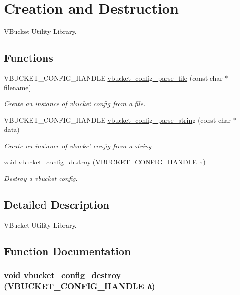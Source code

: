 \hypertarget{group___c_d}{
\section{Creation and Destruction}
\label{group___c_d}
}


VBucket Utility Library.  


\subsection*{Functions}
\begin{DoxyCompactItemize}
\item 
VBUCKET\_\-CONFIG\_\-HANDLE \hyperlink{group___c_d_gab07e7f5741db4e787cee43f1c42fd061}{vbucket\_\-config\_\-parse\_\-file} (const char $\ast$filename)
\begin{DoxyCompactList}\small\item\em Create an instance of vbucket config from a file. \item\end{DoxyCompactList}\item 
VBUCKET\_\-CONFIG\_\-HANDLE \hyperlink{group___c_d_ga9dbcb358df598b59cb4922b951cb817a}{vbucket\_\-config\_\-parse\_\-string} (const char $\ast$data)
\begin{DoxyCompactList}\small\item\em Create an instance of vbucket config from a string. \item\end{DoxyCompactList}\item 
void \hyperlink{group___c_d_gaca045f4151411fd5535f15b169a8c295}{vbucket\_\-config\_\-destroy} (VBUCKET\_\-CONFIG\_\-HANDLE h)
\begin{DoxyCompactList}\small\item\em Destroy a vbucket config. \item\end{DoxyCompactList}\end{DoxyCompactItemize}


\subsection{Detailed Description}
VBucket Utility Library. 

\subsection{Function Documentation}
\hypertarget{group___c_d_gaca045f4151411fd5535f15b169a8c295}{
\subsubsection[{vbucket\_\-config\_\-destroy}]{\setlength{\rightskip}{0pt plus 5cm}void vbucket\_\-config\_\-destroy (VBUCKET\_\-CONFIG\_\-HANDLE {\em h})}}
\label{group___c_d_gaca045f4151411fd5535f15b169a8c295}


